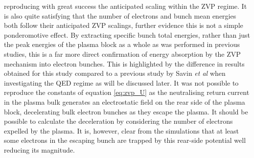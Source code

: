 reproducing with great success the anticipated scaling within the ZVP regime. It is also quite satisfying that the number of electrons and bunch mean energies both follow their anticipated ZVP scalings, further evidence this is not a simple ponderomotive effect. By extracting specific bunch total energies, rather than just the peak energies of the plasma block as a whole as was performed in previous studies, this is a far more direct confirmation of energy absorption by the ZVP mechanism into electron bunches. This is highlighted by the difference in results obtained for this study compared to a previous study by Savin \textit{et al} \cite{savinEnergyAbsorptionLaserQED2019} when investigating the QED regime as will be discussed later. It was not possible to reproduce the constants of equation \ref{eq:zvp_U} as the neutralising return current in the plasma bulk generates an electrostatic field on the rear side of the plasma block, decelerating bulk electron bunches as they escape the plasma. It should be possible to calculate the deceleration by considering the number of electrons expelled by the plasma. It is, however, clear from the simulations that at least some electrons in the escaping bunch are trapped by this rear-side potential well reducing its magnitude.

